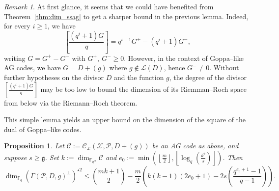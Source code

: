 \documentclass[lettersize,journal]{IEEEtran}
\theoremstyle{plain}
\newtheorem{proposition}[thm]{Proposition}
\theoremstyle{definition}
\theoremstyle{remark}
\newtheorem{remark}[thm]{Remark}
\newcommand{\calP}{\mathcal{P}}
\newcommand{\calL}{\mathcal{L}}
\newcommand{\calC}{\mathcal{C}}
\newcommand{\calX}{\mathcal{X}}
\newcommand{\fqm}{\mathbb{F}_{q^m}}
\newcommand{\fq}{\mathbb{F}_{q}}
\begin{document}
	\begin{remark}\label{rmk:improvements}
		At first glance, it seems that we could have benefited from Theorem~\ref{thm:dim_ssag} to get a sharper bound in the previous lemma. Indeed, for every $i \geq 1$, we have 
		\[\left[\frac{(q^i+1)G}{q}\right]=q^{i-1}G^+ - (q^i+1)G^-,\]
		writing $G=G^+-G^-$ with $G^+, \: G^- \geq 0$. However, in the context of Goppa--like AG codes, we have $G=D+(g)$ where $g \notin \calL(D)$, hence $G^- \neq 0$. Without further hypotheses on the divisor $D$ and the function $g$, the degree of the divisor $\left[\frac{(q^i+1)G}{q}\right]$ may be too low to bound the dimension of its Riemman--Roch space from below via the Riemann--Roch theorem.
	\end{remark}
	
	This simple lemma yields an upper bound on the dimension of the square of the dual of Goppa--like codes.
	\begin{proposition} \label{prop:bound_dim_using_inclusions}
		Let $\calC := \calC_{\calL}(\calX,\calP,D+(g))$ be an AG code as above, and suppose $s \geq \mathfrak{g}$. Set $k := \dim_{\fqm}\calC$ and  $e_0 := \min\left(\left\lfloor \frac{m}{2} \right\rfloor,\left\lfloor \log_q\left(\frac{k^2}{s}\right)\right\rfloor\right)$. Then
		$$\dim_{\fq} (\Gamma(\calP,D,g)^{\perp})^{\star 2} \leq \binom{mk+1}{2} - \dfrac{m}{2}\left(k(k-1)(2e_0+1)-2s\left(\dfrac{q^{e_0+1}-1}{q-1}\right)\right).$$
	\end{proposition}
	
\end{document}
